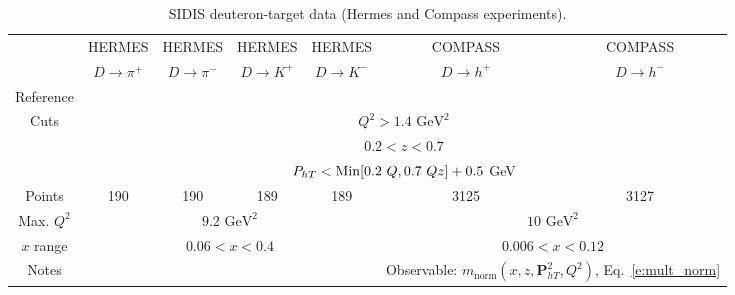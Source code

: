 \documentclass[aps,preprintnumbers,showpacs,nofootinbib,superscriptaddress,floatfix]{revtex4}
\newcommand{\Tperp}{T}
\begin{document}
\begin{table}[h!]
\begin{center}
\begin{tabular}{|c|c|c|c|c|c|c|}
 \hline
  & HERMES & HERMES & HERMES & HERMES & COMPASS & COMPASS\\
 ~          &  $D \to \pi^+$    &   $D \to \pi^-$    &  $D \to K^+$    &   $D \to K^-$      &  $D \to h^+$    &   $D \to h^-$            \\
 \hline
 Reference & \multicolumn{4}{c|}{\cite{Airapetian:2012ki}}        &\multicolumn{2}{c|}{\cite{Adolph:2013stb}} \\
\hline
\multirow{3}{*}{Cuts}             & \multicolumn{6}{c|}{$Q^2 > 1.4 \text{ GeV}^2$}     \\
             & \multicolumn{6}{c|}{$0.2 <z <0.7$}     \\
             & \multicolumn{6}{c|}{$P_{h \Tperp}< {\rm Min}[0.2\ Q, 0.7 \ Q z ] +0.5$ GeV}     \\
\hline
 Points         &  190 & 190 & 189 & 189   & 3125 & 3127   \\
 \hline
Max. $Q^2$      &  \multicolumn{4}{c|}{$9.2 \text{ GeV}^2 $}      & \multicolumn{2}{c|}{$10 \text{ GeV}^2 $}             \\
 \hline
$x$ range       & \multicolumn{4}{c|}{$0.06 < x < 0.4$ }    &  \multicolumn{2}{c|}{$0.006 < x < 0.12$ }             \\
\hline
Notes         &\multicolumn{4}{c|}{ }   & \multicolumn{2}{c|}{Observable: $\displaystyle m_{\text{norm}}(x,z,\bm{P}_{h\Tperp}^2, Q^2)$, Eq.~\eqref{e:mult_norm}}  \\
\hline 
\end{tabular}
\caption{SIDIS deuteron-target data (Hermes and Compass experiments).}
\label{t:data_SIDIS_deuteron}
\end{center}
\end{table}
\end{document}
